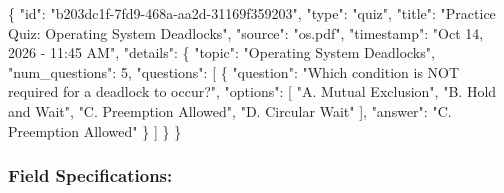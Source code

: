 \documentclass[
]{article}
\newenvironment{Shaded}{}{}
\newcommand{\DataTypeTok}[1]{\textcolor[rgb]{0.56,0.13,0.00}{#1}}
\newcommand{\DecValTok}[1]{\textcolor[rgb]{0.25,0.63,0.44}{#1}}
\newcommand{\FunctionTok}[1]{\textcolor[rgb]{0.02,0.16,0.49}{#1}}
\newcommand{\OtherTok}[1]{\textcolor[rgb]{0.00,0.44,0.13}{#1}}
\newcommand{\StringTok}[1]{\textcolor[rgb]{0.25,0.44,0.63}{#1}}
\begin{document}
\begin{Shaded}
\begin{Highlighting}[]
\FunctionTok{\{}
  \DataTypeTok{"id"}\FunctionTok{:} \StringTok{"b203dc1f{-}7fd9{-}468a{-}aa2d{-}31169f359203"}\FunctionTok{,}
  \DataTypeTok{"type"}\FunctionTok{:} \StringTok{"quiz"}\FunctionTok{,}
  \DataTypeTok{"title"}\FunctionTok{:} \StringTok{"Practice Quiz: Operating System Deadlocks"}\FunctionTok{,}
  \DataTypeTok{"source"}\FunctionTok{:} \StringTok{"os.pdf"}\FunctionTok{,}
  \DataTypeTok{"timestamp"}\FunctionTok{:} \StringTok{"Oct 14, 2026 {-} 11:45 AM"}\FunctionTok{,}
  \DataTypeTok{"details"}\FunctionTok{:} \FunctionTok{\{}
    \DataTypeTok{"topic"}\FunctionTok{:} \StringTok{"Operating System Deadlocks"}\FunctionTok{,}
    \DataTypeTok{"num\_questions"}\FunctionTok{:} \DecValTok{5}\FunctionTok{,}
    \DataTypeTok{"questions"}\FunctionTok{:} \OtherTok{[}
      \FunctionTok{\{}
        \DataTypeTok{"question"}\FunctionTok{:} \StringTok{"Which condition is NOT required for a deadlock to occur?"}\FunctionTok{,}
        \DataTypeTok{"options"}\FunctionTok{:} \OtherTok{[}
          \StringTok{"A. Mutual Exclusion"}\OtherTok{,}
          \StringTok{"B. Hold and Wait"}\OtherTok{,}
          \StringTok{"C. Preemption Allowed"}\OtherTok{,}
          \StringTok{"D. Circular Wait"}
        \OtherTok{]}\FunctionTok{,}
        \DataTypeTok{"answer"}\FunctionTok{:} \StringTok{"C. Preemption Allowed"}
      \FunctionTok{\}}
    \OtherTok{]}
  \FunctionTok{\}}
\FunctionTok{\}}
\end{Highlighting}
\end{Shaded}

\subsubsection{Field Specifications:}\label{field-specifications}
\end{document}

